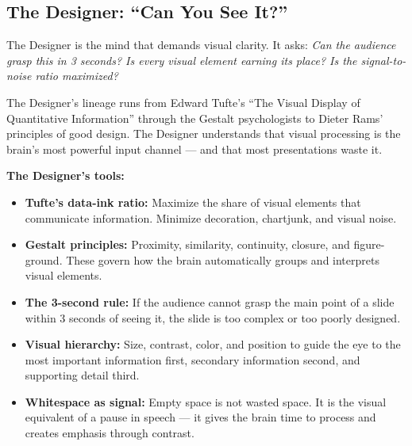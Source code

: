 
\subsection{The Designer: ``Can You See It?''}

The Designer is the mind that demands visual clarity. It asks: \emph{Can the audience grasp this in 3 seconds? Is every visual element earning its place? Is the signal-to-noise ratio maximized?}

The Designer's lineage runs from Edward Tufte's ``The Visual Display of Quantitative Information'' through the Gestalt psychologists to Dieter Rams' principles of good design. The Designer understands that visual processing is the brain's most powerful input channel --- and that most presentations waste it.

\textbf{The Designer's tools:}

\begin{itemize}
  \item \textbf{Tufte's data-ink ratio:} Maximize the share of visual elements that communicate information. Minimize decoration, chartjunk, and visual noise.
  \item \textbf{Gestalt principles:} Proximity, similarity, continuity, closure, and figure-ground. These govern how the brain automatically groups and interprets visual elements.
  \item \textbf{The 3-second rule:} If the audience cannot grasp the main point of a slide within 3 seconds of seeing it, the slide is too complex or too poorly designed.
  \item \textbf{Visual hierarchy:} Size, contrast, color, and position to guide the eye to the most important information first, secondary information second, and supporting detail third.
  \item \textbf{Whitespace as signal:} Empty space is not wasted space. It is the visual equivalent of a pause in speech --- it gives the brain time to process and creates emphasis through contrast.
\end{itemize}

